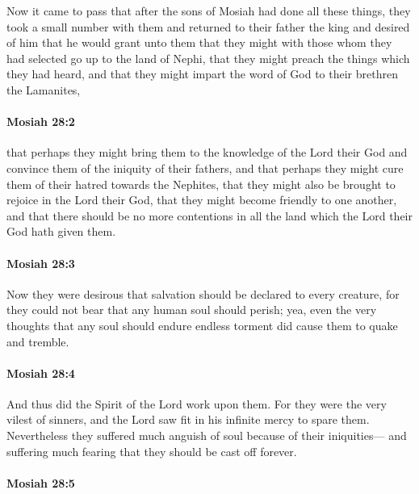 			Now it came to pass that after the sons of Mosiah had done all these things,
			they took a small number with them and returned to their father the king
			and desired of him that he would grant unto them
			that they might with those whom they had selected go up to the land of Nephi,
			that they might preach the things which they had heard,
			and that they might impart the word of God to their brethren the Lamanites,

		\paragraph{Mosiah 28:2} %
			\label{MOSIAH-28-2}

			that perhaps they might bring them to the knowledge of the Lord their God
			and convince them of the iniquity of their fathers,
			and that perhaps they might cure them of their hatred towards the Nephites,
			that they might also be brought to rejoice in the Lord their God,
			that they might become friendly to one another,
			and that there should be no more contentions
			in all the land which the Lord their God hath given them.

		\paragraph{Mosiah 28:3} %
			\label{MOSIAH-28-3}

			Now they were desirous that salvation should be declared to every creature,
			for they could not bear that any human soul should perish;
			yea, even the very thoughts that any soul should endure endless torment
			did cause them to quake and tremble.

		\paragraph{Mosiah 28:4} %
			\label{MOSIAH-28-4}

			And thus did the Spirit of the Lord work upon them.
			For they were the very vilest of sinners,
			and the Lord saw fit in his infinite mercy to spare them.
			Nevertheless they suffered much anguish of soul because of their iniquities---
			and suffering much fearing that they should be cast off forever.

		\paragraph{Mosiah 28:5} %
			\label{MOSIAH-28-5}

